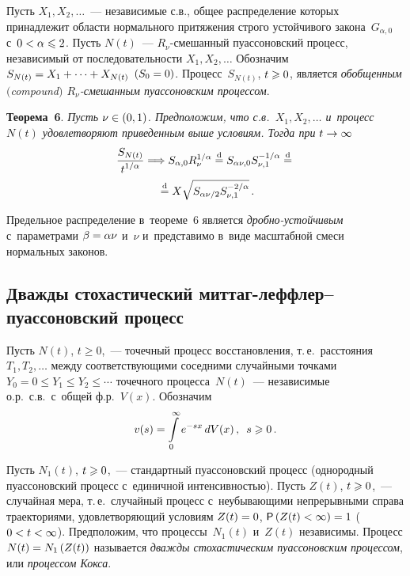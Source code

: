 \begin{multicols}{2}
Пусть $X_1,X_2,\ldots$~--- независимые с.в., общее распределение
которых принадлежит области нормального притяжения строго
устойчивого закона~$G_{\alpha,0}$ с~$0\hm<\alpha\hm\leqslant2$. Пусть $N(t)$~---
$R_{\nu}$-сме\-шан\-ный пуассоновский процесс, независимый от
последовательности $X_1,X_2,\ldots$ Обозначим
$S_{N(t)}\hm=X_1+\cdots+X_{N(t)}$ $(S_0\hm=0)$. Процесс~$S_{N(t)}$,
$t\hm\geqslant0$, является {\it обобщенным $($compound$)$ $R_{\nu}$-сме\-шан\-ным
пуассоновским процессом}.

\bigskip

\noindent
\textbf{Теорема~6}. \textit{Пусть $\nu\hm\in(0,1)$. Предположим, что с.в.\
$X_1,X_2,\ldots$ и~процесс $N(t)$ удовлетворяют приведенным выше
условиям. Тогда при $t\hm\to\infty$}
\begin{multline*}
\displaystyle\frac{\displaystyle S_{N(t)}\mathstrut}{\displaystyle t^{1/\alpha}\mathstrut}\Longrightarrow S_{\alpha,0} 
R^{1/\alpha}_{\nu}\stackrel{\mathrm{d}}{=} S_{\alpha\nu,0}S_{\nu,1}^{-1/\alpha}\stackrel{\mathrm{d}}{=}{}\\
{}\stackrel{\mathrm{d}}{=}
X \sqrt{S_{\alpha\nu/2}S_{\nu,1}^{-2/\alpha}}\,.
\end{multline*}

\smallskip

Предельное распределение в~теореме~6 является 
{\it дроб\-но-устой\-чи\-вым}~\cite{FSD2001} с~параметрами $\beta\hm=\alpha\nu$ 
и~$\nu$ и~представимо в~виде масштабной смеси нормальных законов.

\subsection{Дважды стохастический миттаг-леффлер--пуассоновский процесс}

Пусть $N(t)$, $t\geqslant0$,~--- точечный процесс восстановления, т.\,е.\
расстояния $T_1,T_2,\ldots$ между соответствующими соседними
случайными точками $Y_0=0\leqslant Y_1\leqslant Y_2\leqslant\cdots$ 
точечного процесса~$N(t)$~--- независимые о.р.\ с.в.\ с~общей ф.р.~$V(x)$. Обозначим
$$
v(s)=\int\limits_{0}^{\infty}e^{-sx}\,dV(x)\,,\enskip s\geqslant0\,.
$$

Пусть $N_1(t)$, $t\hm\geqslant 0$,~--- стандартный пуассоновский процесс
(однородный пуассоновский процесс с~единичной интенсивностью). Пусть
$Z(t)$, $t\hm\geqslant0$,~--- случайная мера, т.\,е.\ случайный процесс 
с~неубывающими непрерывными справа траек\-то\-ри\-ями, удовле\-тво\-ря\-ющий
условиям $Z(t)\hm=0$, ${\sf P}\left(Z(t)\hm<\infty\right)=1$ ($0\hm<t\hm<\infty$).
Предположим, что процессы~$N_1(t)$ и~$Z(t)$ независимы. Процесс
$N(t)\hm=N_1\left(Z(t)\right)$ называется {\it дважды стохастическим
пуассоновским процессом}, или {\it процессом Кокса}.


\end{multicols}
